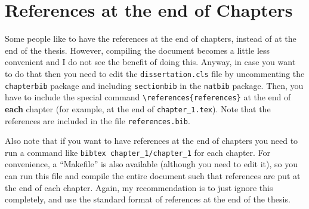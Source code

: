 \chapter{References at the end of Chapters}
\label{app:references_end_chapters}

\graphicspath{{appendix_b/figures/}} %

Some people like to have the references at the end of chapters, instead of at the end of the thesis. However, compiling the document becomes a little less convenient and I do not see the benefit of doing this. Anyway, in case you want to do that then you need to edit the \texttt{dissertation.cls} file by uncommenting the \texttt{chapterbib} package and including \texttt{sectionbib} in the \texttt{natbib} package. Then, you have to include the special command \texttt{\textbackslash references\{references\}} at the end of \textbf{each} chapter (for example, at the end of \texttt{chapter\_1.tex}). Note that the references are included in the file \texttt{references.bib}.

Also note that if you want to have references at the end of chapters you need to run a command like \texttt{bibtex chapter\_1/chapter\_1} for each chapter. For convenience, a ``Makefile'' is also available (although you need to edit it), so you can run this file and compile the entire document such that references are put at the end of each chapter. Again, my recommendation is to just ignore this completely, and use the standard format of references at the end of the thesis. 